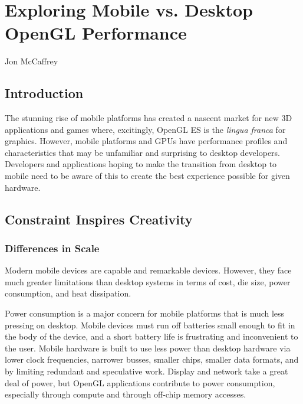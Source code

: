 \chapter{Exploring Mobile vs. Desktop OpenGL Performance}{Jon McCaffrey}
\label{Exploring-Mobile-vs-Desktop-OpenGL-Performance}

\section{Introduction}

The stunning rise of mobile platforms has created a nascent market for new 3D
applications and games where, excitingly, OpenGL ES is the \textit{lingua
franca} for graphics. However, mobile platforms and GPUs have performance
profiles and characteristics that may be unfamiliar and surprising to desktop
developers.  Developers and applications hoping to make the transition from
desktop to mobile need to be aware of this to create the best experience
possible for given hardware.

\section{Constraint Inspires
Creativity}\label{Jon-McCaffrey:Constraints-Inspire-Creativity}

\subsection{Differences in
Scale}\label{Jon-McCaffrey:Architectural-Differences} Modern mobile devices are
capable and remarkable devices.  However, they face much greater limitations
than desktop systems in terms of cost, die size, power consumption, and heat
dissipation.

Power consumption is a major concern for mobile platforms that is much less
pressing on desktop.  Mobile devices must run off batteries small enough to fit
in the body of the device, and a short battery life is frustrating and
inconvenient to the user.  Mobile hardware is built to use less power than
desktop hardware via lower clock frequencies, narrower busses, smaller chips,
smaller data formats, and by limiting redundant and speculative work.  Display
and network take a great deal of power, but OpenGL applications contribute to
power consumption, especially through compute and through off-chip memory
accesses.

